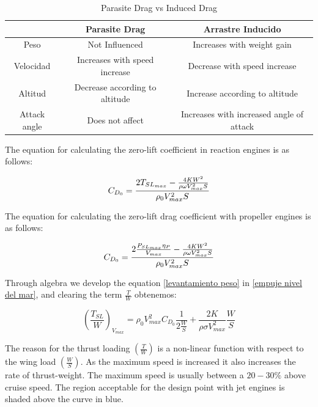\begin{table}[h]
    \centering
    \resizebox{14cm}{!} {
    \begin{tabular}{|c|c|c|}
    \hline
         & \textbf{Parasite Drag } & \textbf{Arrastre Inducido}\\
         \hline
      Peso   &  Not Influenced & Increases with weight gain\\
      Velocidad & Increases with speed increase & Decrease with speed increase\\
      Altitud & Decrease according to altitude  & Increase according to altitude\\
      Attack angle & Does not affect & Increases with increased angle of attack\\
      \hline
    \end{tabular}
    }
    \caption{Parasite Drag vs Induced Drag}
    \label{Arrastre parásito vs Arrastre inducido}
\end{table}

The equation for calculating the zero-lift coefficient in reaction engines is as follows:

\begin{equation}
    C_{D_0} = \frac{2 T_{SL_{max}} - \frac{4 K W^2}{\rho \omega V_{max}^2 S}} {{\rho_{0} V_{max}^2 S}}\\
\end{equation}

The equation for calculating the zero-lift drag coefficient with propeller engines is as follows:

\begin{equation}
    C_{D_0} = \frac{2 \frac{P_{SL_{max}} \eta_{P}}{V_{max}}  - \frac{4 K W^2}{\rho \omega V_{max}^2 S}} {\rho_{0} V_{max}^2 S} \\
\end{equation}

\medskip

Through algebra we develop the equation \ref{levantamiento peso} in \ref{empuje nivel del mar}, and clearing the term $\frac{T}{W}$ obtenemos:

\begin{equation}
    (\frac{T_{SL}}{W})_{V_{max}} = \rho_0 V_{max}^2 C_{D_{0}} \frac{1}{2 \frac{W}{S}} + \frac{2K}{\rho \sigma V_{max}^2} \frac{W}{S}
\end{equation}

The reason for the thrust loading $(\frac{T}{W})$ is a non-linear function with respect to the wing load $(\frac{W}{S})$. As the maximum speed is increased it also increases the rate of thrust-weight. The maximum speed is usually between a $20-30 \%$ above cruise speed. The region acceptable for the design point with jet engines is shaded above the curve in blue.

